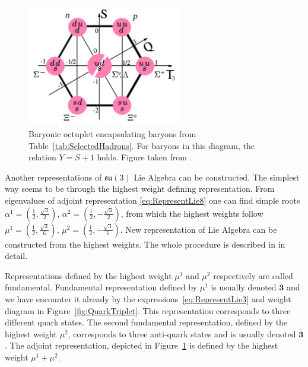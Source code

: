 \begin{figure}[t]
  \centering
  \includegraphics[width=0.6\textwidth]{Chapter1/Baryon-octet.png} 
  \caption[Baryonic octuplet encapsulating baryons from
          Table~\ref{tab:SelectedHadrons}. For baryons in this diagram, the relation $Y
          = S + 1$ holds.]
          {Baryonic octuplet encapsulating baryons from
          Table~\ref{tab:SelectedHadrons}. For baryons in this diagram, the
          relation $Y = S + 1$ holds. Figure taken from \cite{wiki:EightFoldWay}.}
  \label{fig:BaryonicOctet}
\end{figure}

Another representations of $\mathfrak{su}(3)$ Lie Algebra can be constructed.
The simplest way seems to be through the highest weight defining representation.
From eigenvalues of adjoint representation \eqref{eq:RepresentLie8} one can find
simple roots 
$\alpha^1=\left( \frac{1}{2}, \frac{\sqrt{3}}{2} \right)$, 
$\alpha^2=\left( \frac{1}{2}, - \frac{\sqrt{3}}{2} \right)$, 
from which the highest weights follow
$\mu^1=\left( \frac{1}{2}, \frac{\sqrt{3}}{6} \right)$, 
$\mu^2=\left( \frac{1}{2}, - \frac{\sqrt{3}}{6} \right)$. 
New representation of Lie Algebra can be constructed from the highest weights.
The whole procedure is described in \cite{LieAlgebrasForParticlePhysicists} in
detail.

Representations defined by the highest weight $\mu^1$ and $\mu^2$ respectively are
called fundamental. Fundamental representation defined by $\mu^1$ is usually
denoted $\mathbf{3}$ and we have encounter it already by the
expressions~\eqref{eq:RepresentLie3} and weight diagram in
Figure~\ref{fig:QuarkTriplet}. This representation corresponds to three
different quark states.  
The second fundamental representation, defined by the highest weight $\mu^2$,
corresponds to three anti-quark states and is usually denoted
$\bar{\mathbf{3}}$. 
The adjoint representation, depicted in Figure~\ref{fig:BaryonicOctet} is
defined by the highest weight $\mu^1 + \mu^2$.

